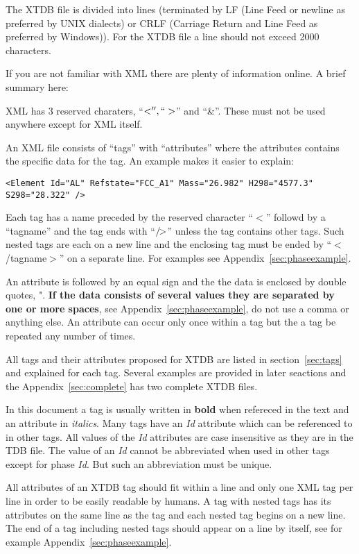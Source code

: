 \documentclass{article}
\newcommand\eoxml{/\hspace{-4pt}>}
\begin{document}
The XTDB file is divided into lines (terminated by LF (Line Feed or
newline as preferred by UNIX dialects) or CRLF (Carriage Return and
Line Feed as preferred by Windows)).  For the XTDB file a line should
not exceed 2000 characters.

If you are not familiar with XML there are plenty of information
online.  A brief summary here:

XML has 3 reserved charaters, ``$<'', ``>$'' and ``\&''.  These must
not be used anywhere except for XML itself.

An XML file consists of ``tags'' with ``attributes'' where the
attributes contains the specific data for the tag.  An example makes
it easier to explain:

\begin{verbatim}
<Element Id="AL" Refstate="FCC_A1" Mass="26.982" H298="4577.3" S298="28.322" />
\end{verbatim}

Each tag has a name preceded by the reserved character ``$<$'' followd
by a ``tagname'' and the tag ends with ``$\eoxml$'' unless the tag
contains other tags.  Such nested tags are each on a new line and the
enclosing tag must be ended by ``$<$/tagname$>$'' on a separate
line.  For examples see Appendix~\ref{sec:phaseexample}.

An attribute is followed by an equal sign and the the data is enclosed
by double quotes, ".  {\bf If the data consists of several values they
  are separated by one or more spaces}, see
Appendix~\ref{sec:phaseexample}, do not use a comma or anything else.
An attribute can occur only once within a tag but the a tag be
repeated any number of times.

All tags and their attributes proposed for XTDB are listed in
section~\ref{sec:tags} and explained for each tag.  Several examples
are provided in later seactions and the Appendix~\ref{sec:complete}
has two complete XTDB files.

In this document a tag is usually written in {\bf bold} when refereced
in the text and an attribute in {\em italics}.  Many tags have an {\em
  Id} attribute which can be referenced to in other tags.  All values
of the {\em Id} attributes are case insensitive as they are in the TDB
file.  The value of an {\em Id} cannot be abbreviated when used in
other tags except for phase {\em Id}.  But such an abbreviation must
be unique.

All attributes of an XTDB tag should fit within a line and only one
XML tag per line in order to be easily readable by humans.  A tag with
nested tags has its attributes on the same line as the tag and each
nested tag begins on a new line.  The end of a tag including nested
tags should appear on a line by itself, see for example
Appendix~\ref{sec:phaseexample}.
\end{document}
